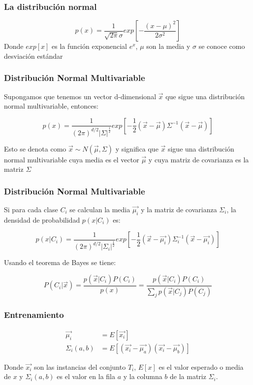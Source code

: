 \documentclass{beamer}
\begin{document}
	\begin{frame}
	\frametitle{La distribución normal}
	\begin{equation}
		p(x) = \frac{1}{\sqrt{2\pi}\sigma}exp\left[-\frac{(x-\mu)^2}{2\sigma^2}\right]
	\label{eq:normal}
	\end{equation}
	Donde $exp[x]$ es la función exponencial $e^x$, $\mu$ son la media y $\sigma$ se conoce como desviación estándar
	\end{frame}
	
	\begin{frame}
	\frametitle{Distribución Normal Multivariable}
	Supongamos que tenemos un vector d-dimensional $\vec{x}$ que sigue una distribución normal multivariable, entonces:

	\begin{equation}\label{eq:multDens}
		p(x) = \frac{1}{(2\pi)^{d/2}|\Sigma|^\frac{1}{2}} exp\left[{-\frac{1}{2}(\vec{x}-\vec{\mu})\Sigma^{-1}(\vec{x}-\vec{\mu})}\right]
	\end{equation}

Esto se denota como $\vec{x} \sim N(\vec{\mu},\Sigma)$ y significa que $\vec{x}$ sigue una distribución normal multivariable cuya media es el vector $\vec{\mu}$ y cuya matriz de covarianza es la matriz $\Sigma$
	\end{frame}
	
	\begin{frame}
	\frametitle{Distribución Normal Multivariable}
	Si para cada clase $C_i$ se calculan la media $\vec{\mu_i}$ y la matriz de covarianza $\Sigma_i$, la densidad de probabilidad $p(x|C_i)$ es:

	\begin{equation}\label{eq:multivariate}
		p(x|C_i) = \frac{1}{(2\pi)^{d/2}|\Sigma_i|^\frac{1}{2}} exp\left[{-\frac{1}{2}(\vec{x}-\vec{\mu_i})\Sigma_i^{-1}(\vec{x}-\vec{\mu_i})}\right]
	\end{equation}
	
	Usando el teorema de Bayes se tiene:
	
	\begin{equation}\label{eq:multBayes}
		P(C_i|\vec{x}) = \frac{p(\vec{x}|C_i)P(C_i)}{p(x)} = \frac{p(\vec{x}|C_i)P(C_i)}{ \sum_j{p(\vec{x}|C_j)P(C_j)} }
	\end{equation}
	\end{frame}
	
	\begin{frame}
	\frametitle{Entrenamiento}
	\begin{equation}\label{eq:multiParams}
	\begin{aligned}
		\vec{\mu_i} &= E[ \vec{x_i} ] \\
		\Sigma_i(a,b) &= E[ (\vec{x_i}-\vec{\mu_a})(\vec{x_i}-\vec{\mu_b}) ]
	\end{aligned}
	\end{equation}

	Donde $\vec{x_i}$ son las instancias del conjunto $T_i$, $E[x]$ es el valor esperado o media de $x$ y $\Sigma_i(a,b)$ es el valor en la fila $a$ y la columna $b$ de la matriz $\Sigma_i$.
	\end{frame}
	
\end{document}
